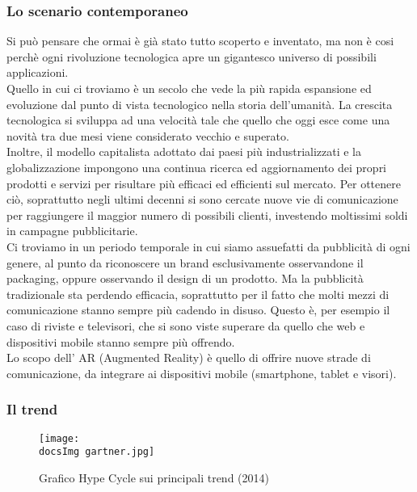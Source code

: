 \subsubsection{Lo scenario contemporaneo}
Si pu\`o pensare che ormai \`e gi\`a stato tutto scoperto e inventato, ma non \`e cosi perch\`e ogni rivoluzione tecnologica apre un gigantesco universo di possibili applicazioni. 
\\
Quello in cui ci troviamo \`e un secolo che vede la pi\`u rapida espansione ed evoluzione dal punto di vista tecnologico nella storia dell'umanit\`a. La crescita tecnologica si sviluppa ad una velocit\`a tale che quello che oggi esce come una novit\`a tra due mesi viene considerato vecchio e superato.
\\
Inoltre, il modello capitalista adottato dai paesi pi\`u industrializzati e la globalizzazione impongono una continua ricerca ed aggiornamento dei propri prodotti e servizi per risultare pi\`u efficaci ed efficienti sul mercato. Per ottenere ci\`o, soprattutto negli ultimi decenni si sono cercate nuove vie di comunicazione per raggiungere il maggior numero di possibili clienti, investendo moltissimi soldi in campagne pubblicitarie.
\\
Ci troviamo in un periodo temporale in cui siamo assuefatti da pubblicit\`a di ogni genere, al punto da riconoscere un brand esclusivamente osservandone il packaging, oppure osservando il design di un prodotto.
Ma la pubblicit\`a tradizionale sta perdendo efficacia, soprattutto per il fatto che molti mezzi di comunicazione stanno sempre pi\`u cadendo in disuso. Questo \`e, per esempio il caso di riviste e televisori, che si sono viste superare da quello che web e dispositivi mobile stanno sempre pi\`u offrendo.
\\
Lo scopo dell' AR (Augmented Reality) \`e quello di offrire nuove strade di comunicazione, da integrare ai dispositivi mobile (smartphone, tablet e visori).

\subsubsection{Il trend}
\begin{figure}[H]
	\centering
	\texttt{[image: \\docsImg gartner.jpg]}
	\caption{Grafico Hype Cycle sui principali trend (2014)}
	\label{fig: Grafico Hype Cycle sui principali trend (2014)}
\end{figure}

